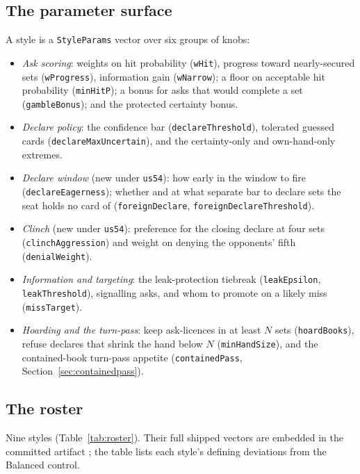 \documentclass[11pt]{article}
\newcommand{\code}[1]{\texttt{#1}}
\newcommand{\usff}{\code{us54}}
\begin{document}
\subsection{The parameter surface}

A style is a \code{StyleParams} vector \cite{styles} over six groups of knobs:

\begin{itemize}
\item \emph{Ask scoring}: weights on hit probability (\code{wHit}), progress toward
  nearly-secured sets (\code{wProgress}), information gain (\code{wNarrow}); a floor on
  acceptable hit probability (\code{minHitP}); a bonus for asks that would complete a set
  (\code{gambleBonus}); and the protected certainty bonus.
\item \emph{Declare policy}: the confidence bar (\code{declareThreshold}), tolerated guessed
  cards (\code{declareMaxUncertain}), and the certainty-only and own-hand-only extremes.
\item \emph{Declare window} (new under \usff{}): how early in the window to fire
  (\code{declareEagerness}); whether and at what separate bar to declare sets the seat holds
  no card of (\code{foreignDeclare}, \code{foreignDeclareThreshold}).
\item \emph{Clinch} (new under \usff{}): preference for the closing declare at four sets
  (\code{clinchAggression}) and weight on denying the opponents' fifth (\code{denialWeight}).
\item \emph{Information and targeting}: the leak-protection tiebreak (\code{leakEpsilon},
  \code{leakThreshold}), signalling asks, and whom to promote on a likely miss
  (\code{missTarget}).
\item \emph{Hoarding and the turn-pass}: keep ask-licences in at least $N$ sets
  (\code{hoardBooks}), refuse declares that shrink the hand below $N$ (\code{minHandSize}),
  and the contained-book turn-pass appetite (\code{containedPass},
  Section~\ref{sec:containedpass}).
\end{itemize}

\subsection{The roster}
\label{sec:roster}

Nine styles (Table~\ref{tab:roster}). Their full shipped vectors are embedded in the committed
artifact \cite{artifact}; the table lists each style's defining deviations from the Balanced
control.
\end{document}

